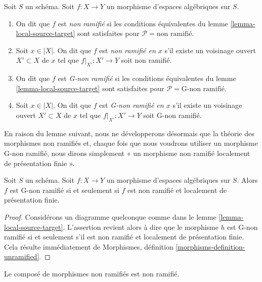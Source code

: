 \begin{definition}
\label{definition-unramified}
Soit $S$ un schéma.
Soit $f : X \to Y$ un morphisme d'espaces algébriques sur $S$.
\begin{enumerate}
\item On dit que $f$ est {\it non ramifié} si les conditions équivalentes du
lemme \ref{lemma-local-source-target}
sont satisfaites pour $\mathcal{P} = \text{non ramifié}$.
\item Soit $x \in |X|$. On dit que $f$ est {\it non ramifié en $x$} s'il
existe un voisinage ouvert $X' \subset X$ de $x$ tel que
$f|_{X'} : X' \to Y$ soit non ramifié.
\item On dit que $f$ est {\it G-non ramifié} si les conditions équivalentes du
lemme \ref{lemma-local-source-target}
sont satisfaites pour $\mathcal{P} = \text{G-non ramifié}$.
\item Soit $x \in |X|$. On dit que $f$ est {\it G-non ramifié en $x$} s'il
existe un voisinage ouvert $X' \subset X$ de $x$ tel que
$f|_{X'} : X' \to Y$ soit G-non ramifié.
\end{enumerate}
\end{definition}

\noindent
En raison du lemme suivant, nous ne développerons désormais que la théorie
des morphismes non ramifiés et, chaque fois que nous voudrons utiliser un morphisme
G-non ramifié, nous dirons simplement « un morphisme non ramifié localement de
présentation finie ».

\begin{lemma}
\label{lemma-unramified-G-unramified}
Soit $S$ un schéma.
Soit $f : X \to Y$ un morphisme d'espaces algébriques sur $S$.
Alors $f$ est G-non ramifié si et seulement si $f$ est non ramifié et
localement de présentation finie.
\end{lemma}

\begin{proof}
Considérons un diagramme quelconque comme dans le
lemme \ref{lemma-local-source-target}.
L'assertion revient alors à dire que le morphisme $h$ est
G-non ramifié si et seulement s'il est non ramifié et localement de
présentation finie. Cela résulte immédiatement de
Morphismes, définition \ref{morphisms-definition-unramified}.
\end{proof}

\begin{lemma}
\label{lemma-composition-unramified}
Le composé de morphismes non ramifiés est non ramifié.
\end{lemma}

